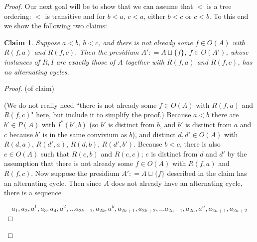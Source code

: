 \documentclass{amsart}
\newtheorem{claim}[theorem]{Claim}
\theoremstyle{definition}
\theoremstyle{remark}
\numberwithin{equation}{section}
\begin{document}
\begin{proof}
Our next goal will be to show that we can assume that $<$ is a tree ordering: $<$ is transitive and for $b < a$, $c< a$, either $b < c$ or $c < b$. To this end we show the following two claims:


\begin{claim}
    \label{order construction 2} Suppose $a < b$, $b < c$, and there is not already some $f\in O(A)$ with $R(f, a)$ and $R(f, c)$. Then the presidium $A' : = A \sqcup \{f\}$, $f \in O(A')$, whose instances of $R, I$ are exactly those of $A$ together with $R(f, a)$ and $R(f, c)$, has no alternating cycles.
\end{claim}


\begin{proof}
(of claim) 

(We do not really need ``there is not already some $f\in O(A)$ with $R(f, a)$ and $R(f, c)$" here, but include it to simplify the proof.) Because $a < b$ there are $b' \in P(A)$ with $I^{*}(b', b)$ (so $b'$ is distinct from $b$, and $b'$ is distinct from $a$ and $c$ because $b'$ is in the same convivium as $b$), and distinct $d, d' \in O(A)$ with $R(d, a)$, $R(d', a)$, $R(d, b)$, $R(d', b')$. Because $b < c$, there is also $e \in O(A)$  such that $R(e, b)$ and $R(e, c)$; $e$ is distinct from $d $ and $d'$ by the assumption that there is not already some $f\in O(A)$ with $R(f, a)$ and $R(f, c)$. Now suppose the presidium $A' : = A \sqcup \{f\}$ described in the claim has an alternating cycle. Then since $A$ does not already have an alternating cycle, there is a sequence 

  $$a_1, a_2, a^{1}, a_{3}, a_{4}, a^{2}, \ldots a_{2k-1}, a_{2k}, a^{k}, a_{2k+1}, a_{2k+2}, \ldots a_{2n-1}, a_{2n}, a^{n}, a_{2n+1}, a_{2n+2} $$


\end{proof}
\end{proof}
\end{document}
